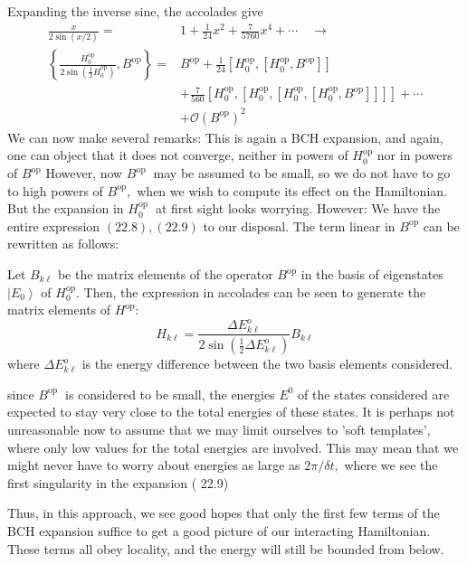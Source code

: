 \documentclass[main.tex]{subfiles}
\begin{document}
Expanding the inverse sine, the accolades give
$$
\begin{aligned}
\frac{x}{2 \sin (x / 2)}=& 1+\frac{1}{24} x^{2}+\frac{7}{5760} x^{4}+\cdots \quad \rightarrow \\
\left\{\frac{H_{0}^{\mathrm{op}}}{2 \sin \left(\frac{1}{2} H_{0}^{\mathrm{op}}\right)}, B^{\mathrm{op}}\right\}=& B^{\mathrm{op}}+\frac{1}{24}\left[H_{0}^{\mathrm{op}},\left[H_{0}^{\mathrm{op}}, B^{\mathrm{op}}\right]\right] \\
&+\frac{7}{560}\left[H_{0}^{\mathrm{op}},\left[H_{0}^{\mathrm{op}},\left[H_{0}^{\mathrm{op}},\left[H_{0}^{\mathrm{op}}, B^{\mathrm{op}}\right]\right]\right]\right]+\cdots \\
&+\mathcal{O}\left(B^{\mathrm{op}}\right)^{2}
\end{aligned}
$$
We can now make several remarks:
This is again a BCH expansion, and again, one can object that it does not converge, neither in powers of $H_{0}^{\mathrm{op}}$ nor in powers of $B^{\mathrm{op}}$ However, now $B^{\text {op }}$ may be assumed to be small, so we do not have to go to high powers of $B^{\mathrm{op}},$ when we wish to compute its effect on the Hamiltonian. But the expansion in $H_{0}^{\text {op }}$ at first sight looks worrying. However:
We have the entire expression $(22.8),(22.9)$ to our disposal. The term linear in $B^{\mathrm{op}}$ can be rewritten as follows:

Let $B_{k \ell}$ be the matrix elements of the operator $B^{\mathrm{op}}$ in the basis of eigenstates $\left|E_{0}\right\rangle$ of $H_{0}^{\mathrm{op}} .$ Then, the expression in accolades can be seen to generate the matrix elements of $H^{\mathrm{op}}:$
$$
H_{k \ell}=\frac{\Delta E_{k \ell}^{o}}{2 \sin \left(\frac{1}{2} \Delta E_{k \ell}^{o}\right)} B_{k \ell}
$$
where $\Delta E_{k \ell}^{o}$ is the energy difference between the two basis elements considered.

since $B^{\text {op }}$ is considered to be small, the energies $E^{0}$ of the states considered are expected to stay very close to the total energies of these states. It is perhaps not unreasonable now to assume that we may limit ourselves to 'soft templates', where only low values for the total energies are involved. This may mean that we might never have to worry about energies as large as $2 \pi / \delta t,$ where we see the first singularity in the expansion ( 22.9)

Thus, in this approach, we see good hopes that only the first few terms of the BCH expansion suffice to get a good picture of our interacting Hamiltonian. These terms all obey locality, and the energy will still be bounded from below.
\end{document}
